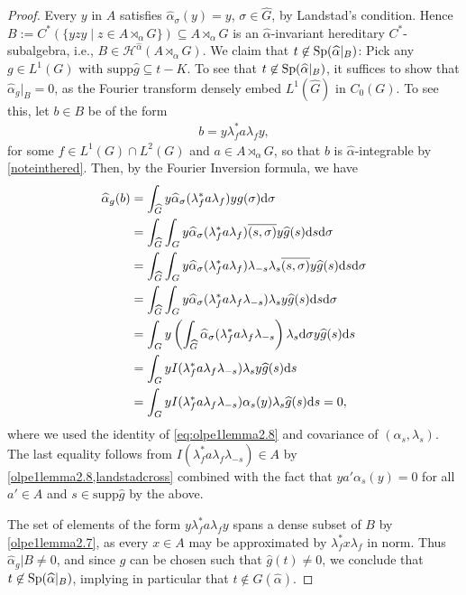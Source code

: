 \begin{proof}
	Every $y$ in $A$ satisfies $\hat\alpha_\sigma(y) = y$, $\sigma \in \hat G$, by Landstad's condition. Hence $B:= C^*(\{y z y \mid z \in A \rtimes_\alpha G\}) \subseteq A \rtimes_\alpha G$ is an $\hat \alpha$-invariant hereditary $C^*$-subalgebra, i.e., $B \in \mathscr{H}^{\hat \alpha}(A \rtimes_\alpha G)$. We claim that $t \not \in \mathrm{Sp}(\widehat{\alpha} |_B)$: Pick any $g \in L^1(G)$ with $\mathrm{supp} \hat g \subseteq t-K$. To see that $t \not \in \mathrm{Sp}(\widehat{\alpha}|_B)$, it suffices to show that $\hat \alpha_g |_B = 0$, as the Fourier transform densely embed $L^1(\hat G)$ in $C_0(G)$. To see this, let $b \in B$ be of the form
	\begin{align*}
		b = y \lambda_f^* a \lambda_f y,
	\end{align*}
	for some $f \in L^1(G) \cap L^2(G)$ and $ a \in A \rtimes_\alpha G$, so that $b$ is $\hat \alpha$-integrable by \cref{noteinthered}. Then, by the Fourier Inversion formula, we have 
	\begin{align*}
		\widehat{\alpha}_g(b) &= \int_{\widehat{G}} y \widehat{\alpha}_\sigma(\lambda_f^* a \lambda_f) y g(\sigma) \mathrm{d} \sigma \\
		&= \int_{\widehat{G}} \int_G y \widehat{\alpha}_\sigma(\lambda_f^* a \lambda_f) \overline{(s,\sigma)} y \widehat{g}(s) \mathrm{d} s \mathrm{d} \sigma\\
		&= \int_{\widehat{G}} \int_G y \widehat{\alpha}_\sigma(\lambda_f^* a \lambda_f) \lambda_{-s} \lambda_s \overline{(s,\sigma)} y \widehat{g}(s) \mathrm{d} s \mathrm{d} \sigma\\
		&= \int_{\widehat{G}} \int_G y \widehat{\alpha}_{\sigma}(\lambda_f^* a \lambda_f \lambda_{-s}) \lambda_s y \widehat{g}(s) \mathrm{d} s \mathrm{d} \sigma\\
		&= \int_{G} y \left( \int_{\widehat{G}} \widehat{\alpha}_{\sigma}(\lambda_f^* a \lambda_f \lambda_{-s}\right) \lambda_s \mathrm{d} \sigma y \widehat{g}(s) \mathrm{d} s\\
		&= \int_G y I(\lambda_f^* a \lambda_f \lambda_{-s}) \lambda_s y \widehat{g}(s) \mathrm{d} s\\
		&= \int_G y I(\lambda_f^* a \lambda_f \lambda_{-s}) \alpha_s(y) \lambda_s \widehat{g}(s)\mathrm{d} s = 0,
	\end{align*}
	where we used the identity of \cref{eq:olpe1lemma2.8} and covariance of $(\alpha_s,\lambda_s)$. The last equality follows from $I(\lambda_f^* a \lambda_f \lambda_{-s}) \in A$ by \cref{olpe1lemma2.8,landstadcross} combined with the fact that $y a' \alpha_s(y)= 0 $ for all $a' \in A$ and $s \in \mathrm{supp} \hat g$ by the above. 
	
	The set of elements of the form $y \lambda_f^* a \lambda_f y$ spans a dense subset of $B$ by \cref{olpe1lemma2.7}, as every $x \in A$ may be approximated by $\lambda_f^* x \lambda_f$ in norm. Thus $\hat \alpha_g | B \neq 0$, and since $g$ can be chosen such that $\hat g (t) \neq 0$, we conclude that $t \not \in \mathrm{Sp}(\widehat{\alpha}|_B)$, implying in particular that  $ t \not \in G(\hat \alpha)$.
	

\end{proof}
